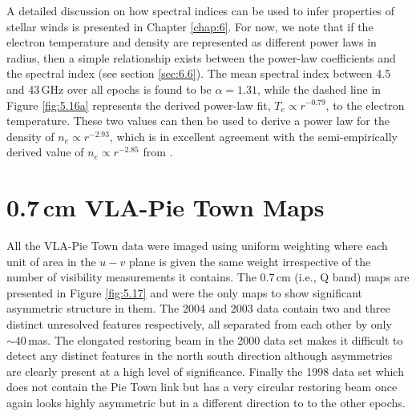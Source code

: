 A detailed discussion on how spectral indices can be used to infer properties of stellar winds is presented in Chapter \ref{chap:6}. For now, we note that if the electron temperature and density are represented as different power laws in radius, then a simple relationship  exists between the power-law coefficients and the spectral index (see section \ref{sec:6.6}). The mean spectral index between 4.5 and 43\,GHz over all epochs is found to be $\alpha =1.31$, while the dashed line in Figure \ref{fig:5.16a} represents the derived power-law fit, $T_{e} \propto r^{-0.79}$, to the electron temperature. These two values can then be used to derive a power law for the density of $n_{e} \propto r^{-2.93}$, which is in excellent agreement with the semi-empirically derived value of $n_{e} \propto r^{-2.85}$ from \cite{harper_2001}.

\section{0.7\,cm VLA-Pie Town Maps}\label{sec:5.15}

All the VLA-Pie Town data were imaged using uniform weighting where each unit of area in the $u-v$ plane is given the same weight irrespective of the number of visibility measurements it contains. The 0.7\,cm (i.e., Q band) maps are presented in Figure \ref{fig:5.17} and were the only maps to show significant asymmetric structure in them. The 2004 and 2003 data contain two and three distinct unresolved features respectively, all separated from each other by only $\sim 40$\,mas. The elongated restoring beam in the 2000 data set makes it difficult to detect any distinct features in the north south direction although asymmetries are clearly present at a high level of significance. Finally the 1998 data set which does not contain the Pie Town link but has a very circular restoring beam once again looks highly asymmetric but in a different direction to to the other epochs.

